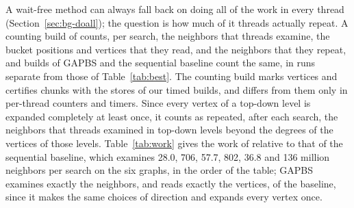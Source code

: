 A wait-free method can always fall back on doing all of the work in every thread (Section~\ref{sec:bg-doall}); the question is how much of it threads actually repeat. A counting build of \wfdo counts, per search, the neighbors that threads examine, the bucket positions and vertices that they read, and the neighbors that they repeat, and builds of GAPBS and the sequential baseline count the same, in runs separate from those of Table~\ref{tab:best}. The counting build marks vertices and certifies chunks with the stores of our timed builds, and differs from them only in per-thread counters and timers. Since every vertex of a top-down level is expanded completely at least once, it counts as repeated, after each search, the neighbors that threads examined in top-down levels beyond the degrees of the vertices of those levels. Table~\ref{tab:work} gives the work of \wfdo relative to that of the sequential baseline, which examines 28.0, 706, 57.7, 802, 36.8 and 136 million neighbors per search on the six graphs, in the order of the table; GAPBS examines exactly the neighbors, and reads exactly the vertices, of the baseline, since it makes the same choices of direction and expands every vertex once.


